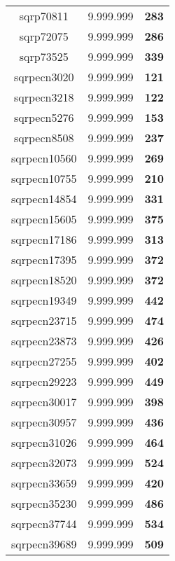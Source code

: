 \begin{tabular}{cc||c}
sqrp70811        & 9.999.999        & {\bf 283}       \\ 
sqrp72075        & 9.999.999        & {\bf 286}       \\ 
sqrp73525        & 9.999.999        & {\bf 339}       \\ 
sqrpecn3020      & 9.999.999        & {\bf 121}       \\ 
sqrpecn3218      & 9.999.999        & {\bf 122}       \\ 
sqrpecn5276      & 9.999.999        & {\bf 153}       \\ 
sqrpecn8508      & 9.999.999        & {\bf 237}       \\ 
sqrpecn10560     & 9.999.999        & {\bf 269}       \\ 
sqrpecn10755     & 9.999.999        & {\bf 210}       \\ 
sqrpecn14854     & 9.999.999        & {\bf 331}       \\ 
sqrpecn15605     & 9.999.999        & {\bf 375}       \\ 
sqrpecn17186     & 9.999.999        & {\bf 313}       \\ 
sqrpecn17395     & 9.999.999        & {\bf 372}       \\ 
sqrpecn18520     & 9.999.999        & {\bf 372}       \\ 
sqrpecn19349     & 9.999.999        & {\bf 442}       \\ 
sqrpecn23715     & 9.999.999        & {\bf 474}       \\ 
sqrpecn23873     & 9.999.999        & {\bf 426}       \\ 
sqrpecn27255     & 9.999.999        & {\bf 402}       \\ 
sqrpecn29223     & 9.999.999        & {\bf 449}       \\ 
sqrpecn30017     & 9.999.999        & {\bf 398}       \\ 
sqrpecn30957     & 9.999.999        & {\bf 436}       \\ 
sqrpecn31026     & 9.999.999        & {\bf 464}       \\ 
sqrpecn32073     & 9.999.999        & {\bf 524}       \\ 
sqrpecn33659     & 9.999.999        & {\bf 420}       \\ 
sqrpecn35230     & 9.999.999        & {\bf 486}       \\ 
sqrpecn37744     & 9.999.999        & {\bf 534}       \\ 
sqrpecn39689     & 9.999.999        & {\bf 509}       \\ 

\end{tabular}
